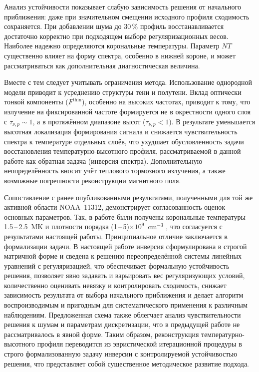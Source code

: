 \documentclass[
 aps, pra,
 amsmath,amssymb,
 11pt,
 final,
tightenlines,
 twoside,
 twocolumn,
 nofloats,
nofootinbib,
 superscriptaddress,
showkeys,
showkeywords,
 ]
{revtex4-2}
\newcommand{\as}[1]{{\color{blue} #1}}
\newcommand{\asrem}[1]{{#1}}
\begin{document}
Анализ устойчивости показывает слабую зависимость решения
от начального приближения: даже при значительном смещении
исходного профиля сходимость сохраняется.
\as{При добавлении шума до 30\,\% профиль восстанавливается достаточно корректно при подходящем выборе регуляризационных весов. Наиболее надежно определяются корональные температуры.}
Параметр $NT$ существенно влияет на форму
спектра, особенно в нижней короне, и может рассматриваться
как дополнительная диагностическая величина.

Вместе с тем следует учитывать ограничения метода.
Использование однородной модели приводит к усреднению структуры
тени и полутени. Вклад оптически тонкой компоненты ($F^{\mathrm{thin}}$),
особенно на высоких частотах, приводит к тому,
что излучение на фиксированной частоте формируется
не в окрестности одного слоя с $\tau_{\nu,p}\sim 1$,
а в протяжённом диапазоне высот ($\tau_{\nu,p}<1$).
В результате уменьшается высотная локализация
формирования сигнала и снижается чувствительность спектра
к температуре отдельных слоёв, что ухудшает обусловленность
задачи восстановления температурно-высотного профиля,
рассматриваемой в данной работе как обратная задача (инверсия спектра).
Дополнительную неопределённость вносит учёт теплового тормозного излучения, а также возможные погрешности реконструкции
магнитного поля.

Сопоставление с ранее опубликованными результатами,
полученными для той же активной области NOAA~11312,
демонстрирует согласованность оценок основных параметров.
Так,  в  работе \cite{Stupishin2018} были получены корональные температуры
1.5\,--\,2.5~MK и плотности порядка
\asrem{
(1\,--\,5)$\times10^{9}$~$\mathrm{cm^{-3}}$}
, что согласуется с результатами настоящей работы.
Принципиальное отличие заключается в формализации задачи.
В настоящей работе инверсия сформулирована
в строгой матричной форме и сведена к решению
переопределённой системы линейных уравнений
с регуляризацией, что обеспечивает формальную
устойчивость решения, позволяет явно задавать
и варьировать вес регуляризующих условий,
количественно оценивать невязку и контролировать
сходимость, снижает зависимость результата
от выбора начального приближения и делает алгоритм
воспроизводимым и пригодным для систематического
применения к различным наблюдениям.
Предложенная схема также облегчает анализ
чувствительности решения к шумам и параметрам
дискретизации, что в предыдущей работе
не рассматривалось в явной форме.
Таким образом, реконструкция температурно-высотного
профиля переводится из эвристической итерационной
процедуры в строго формализованную задачу инверсии
с контролируемой устойчивостью решения,
что представляет собой существенное методическое
развитие подхода.
\end{document}
